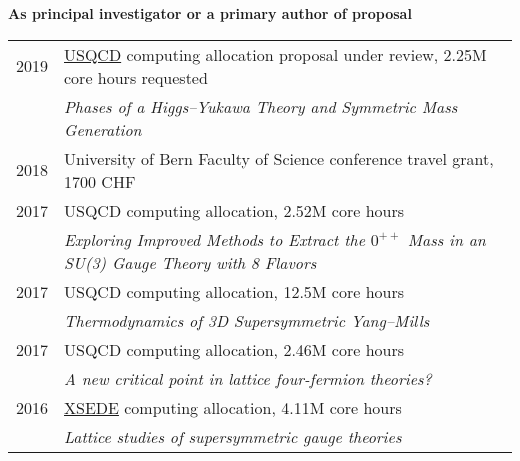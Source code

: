 \renewenvironment{spacelistout} {
  \begin{list} {} {
    \setlength{\topsep}{-8 pt}
    \setlength{\itemsep}{5 pt}
    \setlength{\leftmargin}{-1.15 in}
  }
}{
  \end{list}
}

\raggedright
\vspace{12 pt}
\begin{spacelistout}
  \item {\large \bfseries As principal investigator or a primary author of proposal} \\[10 pt]
    \begin{tabular}[t]{cl}
      2019 & \href{http://www.usqcd.org}{USQCD} computing allocation proposal under review, 2.25M core hours requested \\ %
           & \textit{Phases of a Higgs--Yukawa Theory and Symmetric Mass Generation}                                   \\[6 pt]
      2018 & University of Bern Faculty of Science conference travel grant, 1700 CHF                                  \\[6 pt]
      2017 & USQCD computing allocation, 2.52M core hours                                \\ %
           & \textit{Exploring Improved Methods to Extract the $0^{++}$ Mass in an SU(3) Gauge Theory with 8 Flavors} \\[6 pt]
      2017 & USQCD computing allocation, 12.5M core hours                                                             \\ %
           & \textit{Thermodynamics of 3D Supersymmetric Yang--Mills}                                                 \\[6 pt]
      2017 & USQCD computing allocation, 2.46M core hours                                                             \\ %
           & \textit{A new critical point in lattice four-fermion theories?}                                          \\[6 pt]
      2016 & \href{http://www.xsede.org}{XSEDE} computing allocation, 4.11M core hours                                \\ %
           & \textit{Lattice studies of supersymmetric gauge theories}                                                \\[6 pt]

\end{tabular}
\end{spacelistout}
